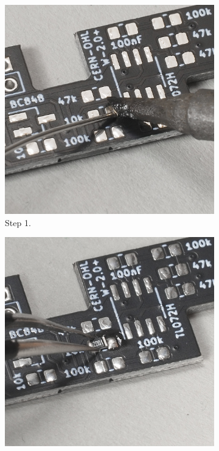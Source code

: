 \documentclass[12pt, a4paper]{article}
\begin{document}
\begin{figure}[H]
    \centering
    \begin{subfigure}{0.3\textwidth}
        \includegraphics[width=\textwidth]{images/02_01_soldering_one_pad.jpg}
        \caption*{Step 1.}
    \end{subfigure}
    \hspace{2mm}
    \begin{subfigure}{0.3\textwidth}
        \includegraphics[width=\textwidth]{images/02_02_component_tweezers.jpg}

\end{subfigure}
\end{figure}
\end{document}
